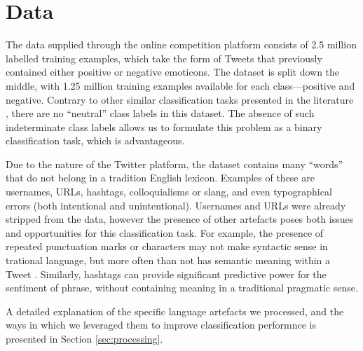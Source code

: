 \section{Data}
\label{sec:data}

The data supplied through the online competition platform consists of 2.5 million labelled training examples, which take the form of Tweets that previously contained either positive or negative emoticons. The dataset is split down the middle, with 1.25 million training examples available for each class---positive and negative. Contrary to other similar classification tasks presented in the literature \cite{jiang2011target, tang2014learning}, there are no ``neutral'' class labels in this dataset. The absence of such indeterminate class labels allows us to formulate this problem as a binary classification task, which is advantageous.

Due to the nature of the Twitter platform, the dataset contains many ``words'' that do not belong in a tradition English lexicon. Examples of these are usernames, URLs, hashtags, colloquialisms or slang, and even typographical errors (both intentional and unintentional). Usernames and URLs were already stripped from the data, however the presence of other artefacts poses both issues and opportunities for this classification task. For example, the presence of repeated punctuation marks or characters may not make syntactic sense in trational language, but more often than not has semantic meaning within a Tweet \cite{tang2014learning}. Similarly, hashtags can provide significant predictive power for the sentiment of phrase, without containing meaning in a traditional pragmatic sense.

A detailed explanation of the specific language artefacts we processed, and the ways in which we leveraged them to improve classification performnce is presented in Section \ref{sec:processing}.

